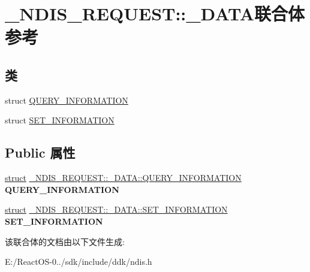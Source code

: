 \hypertarget{union___n_d_i_s___r_e_q_u_e_s_t_1_1___d_a_t_a}{}\section{\+\_\+\+N\+D\+I\+S\+\_\+\+R\+E\+Q\+U\+E\+ST\+:\+:\+\_\+\+D\+A\+T\+A联合体 参考}
\label{union___n_d_i_s___r_e_q_u_e_s_t_1_1___d_a_t_a}
\subsection*{类}
\begin{DoxyCompactItemize}
\item 
struct \hyperlink{struct___n_d_i_s___r_e_q_u_e_s_t_1_1___d_a_t_a_1_1_q_u_e_r_y___i_n_f_o_r_m_a_t_i_o_n}{Q\+U\+E\+R\+Y\+\_\+\+I\+N\+F\+O\+R\+M\+A\+T\+I\+ON}
\item 
struct \hyperlink{struct___n_d_i_s___r_e_q_u_e_s_t_1_1___d_a_t_a_1_1_s_e_t___i_n_f_o_r_m_a_t_i_o_n}{S\+E\+T\+\_\+\+I\+N\+F\+O\+R\+M\+A\+T\+I\+ON}
\end{DoxyCompactItemize}
\subsection*{Public 属性}
\begin{DoxyCompactItemize}
\item 
\mbox{\label{union___n_d_i_s___r_e_q_u_e_s_t_1_1___d_a_t_a_a084951c71d18806929acf3306a64cf13}} 
\hyperlink{interfacestruct}{struct} \hyperlink{struct___n_d_i_s___r_e_q_u_e_s_t_1_1___d_a_t_a_1_1_q_u_e_r_y___i_n_f_o_r_m_a_t_i_o_n}{\+\_\+\+N\+D\+I\+S\+\_\+\+R\+E\+Q\+U\+E\+S\+T\+::\+\_\+\+D\+A\+T\+A\+::\+Q\+U\+E\+R\+Y\+\_\+\+I\+N\+F\+O\+R\+M\+A\+T\+I\+ON} {\bfseries Q\+U\+E\+R\+Y\+\_\+\+I\+N\+F\+O\+R\+M\+A\+T\+I\+ON}
\item 
\mbox{\label{union___n_d_i_s___r_e_q_u_e_s_t_1_1___d_a_t_a_a548b3d24f9820ff868fb601615198e01}} 
\hyperlink{interfacestruct}{struct} \hyperlink{struct___n_d_i_s___r_e_q_u_e_s_t_1_1___d_a_t_a_1_1_s_e_t___i_n_f_o_r_m_a_t_i_o_n}{\+\_\+\+N\+D\+I\+S\+\_\+\+R\+E\+Q\+U\+E\+S\+T\+::\+\_\+\+D\+A\+T\+A\+::\+S\+E\+T\+\_\+\+I\+N\+F\+O\+R\+M\+A\+T\+I\+ON} {\bfseries S\+E\+T\+\_\+\+I\+N\+F\+O\+R\+M\+A\+T\+I\+ON}
\end{DoxyCompactItemize}


该联合体的文档由以下文件生成\+:\begin{DoxyCompactItemize}
\item 
E\+:/\+React\+O\+S-\/0../sdk/include/ddk/ndis.\+h\end{DoxyCompactItemize}
